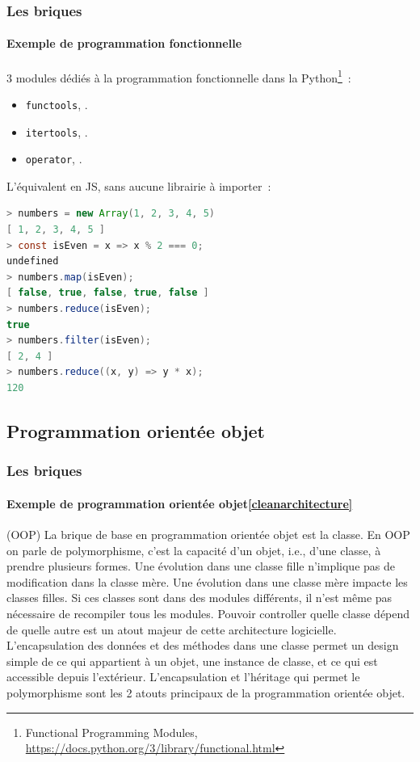 \documentclass{beamer}
\begin{document}
    \begin{frame}[fragile]
        \transdissolve
        \frametitle{Les briques}
        \framesubtitle{Exemple de programmation fonctionnelle}
        3 modules dédiés à la programmation fonctionnelle dans la  Python\footnote{Functional Programming Modules, \url{https://docs.python.org/3/library/functional.html}}~:
        \begin{itemize}
            \item \lstinline{functools}, .
            \item \lstinline{itertools}, .
            \item \lstinline{operator}, .
        \end{itemize}
        L'équivalent en JS, sans aucune librairie à importer~:
        \begin{lstlisting}[language=java]
> numbers = new Array(1, 2, 3, 4, 5)
[ 1, 2, 3, 4, 5 ]
> const isEven = x => x % 2 === 0;
undefined
> numbers.map(isEven);
[ false, true, false, true, false ]
> numbers.reduce(isEven);
true
> numbers.filter(isEven);
[ 2, 4 ]
> numbers.reduce((x, y) => y * x);
120
        \end{lstlisting}
    \end{frame}

    \subsection{Programmation orientée objet}\label{subsec:briques-oop}
    \begin{frame}[fragile]
        \transdissolve
        \frametitle{Les briques}
        \framesubtitle{Exemple de programmation orientée objet\cref{cleanarchitecture}} (OOP)
        La brique de base en programmation orientée objet est la classe.
        \bigbreak
        En OOP on parle de polymorphisme, c'est la capacité d'un objet, i.e., d'une classe, à prendre plusieurs formes.
        Une évolution dans une classe fille n'implique pas de modification dans la classe mère.
        Une évolution dans une classe mère impacte les classes filles.
        Si ces classes sont dans des modules différents, il n'est même pas nécessaire de recompiler tous les modules.
        Pouvoir controller quelle classe dépend de quelle autre est un atout majeur de cette architecture logicielle.
        \bigbreak
        L'encapsulation des données et des méthodes dans une classe permet un design simple de ce qui appartient à un objet, une instance de classe, et ce qui est accessible depuis l'extérieur.
        \bigbreak
        L'encapsulation et l'héritage qui permet le polymorphisme sont les 2 atouts principaux de la programmation orientée objet.
    \end{frame}
\end{document}

